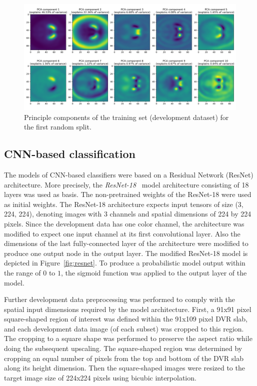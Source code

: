 \begin{figure}[ht]
  \centering
  \includegraphics[width=1.0\textwidth]{content/figures/pca_components_splittrain.png}
  \caption{Principle components of the training set (development dataset) for the first random split.} 
  \label{fig:pca_components}
\end{figure} 

\subsection{CNN-based classification}
\label{subsec:cnn_based_classification}

The models of CNN-based classifiers were based on a Residual Network (ResNet) architecture.
More precisely, the \textit{ResNet-18}~\citep{resnet2015} model architecture consisting of 18 layers was used as basis.
The non-pretrained weights of the ResNet-18 were used as initial weights.
The ResNet-18 architecture expects input tensors of size (3, 224, 224), 
denoting images with 3 channels and spatial dimensions of 224 by 224 pixels.
Since the development data has one color channel, the architecture was modified to expect one input channel at its 
first convolutional layer.
Also the dimensions of the last fully-connected layer of the architecture were modified to produce one output node 
in the output layer.
The modified ResNet-18 model is depicted in Figure~\ref{fig:resnet}.
To produce a probabilistic model output within the range of $0$ to $1$, 
the sigmoid function was applied to the output layer of the model.

Further development data preprocessing was performed to comply with the spatial input 
dimensions required by the model architecture.
First, a 91x91 pixel square-shaped region of interest was defined within the 91x109 pixel DVR slab, 
and each development data image (of each subset) was cropped to this region.
The cropping to a square shape was performed to preserve the aspect ratio while doing the subsequent upscaling.
The square-shaped region was determined by cropping an equal number of pixels from the top and bottom 
of the DVR slab along its height dimension.
Then the square-shaped images were resized to the target image size of 224x224 pixels using bicubic interpolation.

